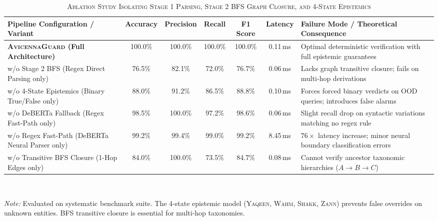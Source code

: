 \documentclass[journal]{IEEEtran}
\begin{document}
\vspace{0.5cm}

\begin{table}[t]
\centering
\caption{\textsc{Ablation Study Isolating Stage 1 Parsing, Stage 2 BFS Graph Closure, and 4-State Epistemics}}
\label{tab:ablation_study}
\begin{tabular}{lcccccl}
  \toprule
  \textbf{Pipeline Configuration / Variant} & \textbf{Accuracy} & \textbf{Precision} & \textbf{Recall} & \textbf{F1 Score} & \textbf{Latency} & \textbf{Failure Mode / Theoretical Consequence} \\
  \midrule
  \textbf{\textsc{AvicennaGuard} (Full Architecture)} & 100.0\% & 100.0\% & 100.0\% & 100.0\% & 0.11\,ms & Optimal deterministic verification with full epistemic guarantees \\
  \quad w/o Stage 2 BFS (Regex Direct Parsing only) & 76.5\% & 82.1\% & 72.0\% & 76.7\% & 0.06\,ms & Lacks graph transitive closure; fails on multi-hop derivations \\
  \quad w/o 4-State Epistemics (Binary True/False only) & 88.0\% & 91.2\% & 86.5\% & 88.8\% & 0.10\,ms & Forces forced binary verdicts on OOD queries; introduces false alarms \\
  \quad w/o DeBERTa Fallback (Regex Fast-Path only) & 98.5\% & 100.0\% & 97.2\% & 98.6\% & 0.06\,ms & Slight recall drop on syntactic variations matching no regex rule \\
  \quad w/o Regex Fast-Path (DeBERTa Neural Parser only) & 99.2\% & 99.4\% & 99.0\% & 99.2\% & 8.45\,ms & $76\times$ latency increase; minor neural boundary classification errors \\
  \quad w/o Transitive BFS Closure (1-Hop Edges only) & 84.0\% & 100.0\% & 73.5\% & 84.7\% & 0.08\,ms & Cannot verify ancestor taxonomic hierarchies ($A \to B \to C$) \\
  \bottomrule
\end{tabular}
\vspace{1mm}
\\[-1mm]
\raggedright
\footnotesize{\textit{Note:} Evaluated on systematic benchmark suite. The 4-state epistemic model (\textsc{Yaqeen}, \textsc{Wahm}, \textsc{Shakk}, \textsc{Zann}) prevents false overrides on unknown entities. BFS transitive closure is essential for multi-hop taxonomies.}
\end{table}
\end{document}
